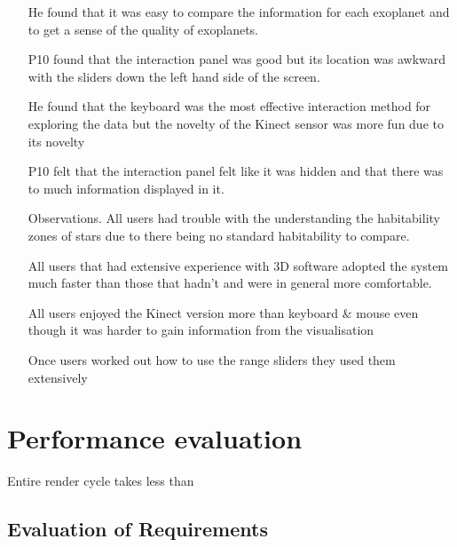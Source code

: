 \begin{enumerate}
         He found that it was easy to compare the information for each exoplanet
and to get a sense of the quality of exoplanets.
         
         P10 found that the interaction panel was good but its location was
awkward with the sliders down the left hand side of the screen.
         
         He found that the keyboard was the most effective interaction method
for exploring the data but the novelty of the Kinect sensor was more fun due to
its novelty
         
         P10 felt that the interaction panel felt like it was hidden and that
there was to much information displayed in it.
         
          \item[Observations.]
         All users had trouble with the understanding the habitability zones of
stars due to there being no standard habitability to compare.
         
         All users that had extensive experience with 3D software adopted the
system much faster than those that hadn't and were in general more comfortable.
         
         All users enjoyed the Kinect version more than keyboard \& mouse even
though it was harder to gain information from the visualisation
         
         Once users worked out how to use the range sliders they used them
extensively
      
\end{enumerate}


\section{Performance evaluation}
Entire render cycle takes less than 

\subsection{Evaluation of Requirements}
